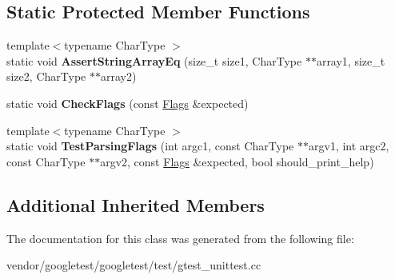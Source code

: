 \subsection*{Static Protected Member Functions}
\begin{DoxyCompactItemize}
\item 
\mbox{\label{classtesting_1_1_init_google_test_test_af32acd91b1185c6868072009dce55a7b}} 
{\footnotesize template$<$typename Char\+Type $>$ }\\static void {\bfseries Assert\+String\+Array\+Eq} (size\+\_\+t size1, Char\+Type $\ast$$\ast$array1, size\+\_\+t size2, Char\+Type $\ast$$\ast$array2)
\item 
\mbox{\label{classtesting_1_1_init_google_test_test_aac37d5d592202bf6614b02fe0b4da9d2}} 
static void {\bfseries Check\+Flags} (const \hyperlink{structtesting_1_1_flags}{Flags} \&expected)
\item 
\mbox{\label{classtesting_1_1_init_google_test_test_add290338cf429308d0ab275ae4c46e69}} 
{\footnotesize template$<$typename Char\+Type $>$ }\\static void {\bfseries Test\+Parsing\+Flags} (int argc1, const Char\+Type $\ast$$\ast$argv1, int argc2, const Char\+Type $\ast$$\ast$argv2, const \hyperlink{structtesting_1_1_flags}{Flags} \&expected, bool should\+\_\+print\+\_\+help)
\end{DoxyCompactItemize}
\subsection*{Additional Inherited Members}


The documentation for this class was generated from the following file\+:\begin{DoxyCompactItemize}
\item 
vendor/googletest/googletest/test/gtest\+\_\+unittest.\+cc\end{DoxyCompactItemize}
